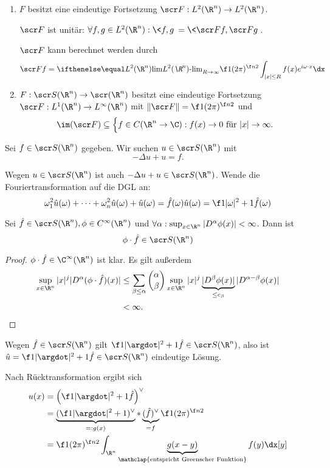 \begin{nt}[Fortsetzungen] \label{4.31}
	\begin{enumerate}[1)]
		\item
			$F$ besitzt eine eindeutige Fortsetzung $\scr F: L^2(\R^n) \to L^2(\R^n)$.

			$\scr F$ ist unitär: $\forall f, g \in L^2(\R^n) : \<f,g\> = \<\scr F f, \scr F g\>$.

			$\scr F$ kann berechnet werden durch
			\[
				\scr F f = \lim[L^2(\R^n)]_{R\to \infty} \f 1{(2\pi)^{\f n2}} \int_{|x|\le R} f(x) e^{i \omega\cdot x} \dx
			\]
		\item
			$F : \scr S(\R^n) \to \scr(\R^n)$ besitzt eine eindeutige Fortsetzung $\scr F: L^1(\R^n) \to L^\infty(\R^n)$ mit $\| \scr F \| = \f 1{(2\pi)^{\f n2}}$ und
			\[
				\im (\scr F) \subset \Big\{ f \in C(\R^n \to \C) : f(x) \to 0 \text{ für $|x| \to \infty$}.
			\]
	\end{enumerate}
\end{nt}

\begin{ex} \label{4.30}
	Sei $f \in \scr S(\R^n)$ gegeben.
	Wir suchen $u \in \scr S(\R^n)$ mit
	\[
		- \Delta u + u = f.
	\]

	Wegen $u \in \scr S(\R^n)$ ist auch $-\Delta u + u \in \scr S(\R^n)$.
	Wende die Fouriertransformation auf die DGL an:
	\[
		\omega_1^2 \hat u(\omega) + \dotsb + \omega_n^2 \hat u(\omega) + \hat u(\omega) = \hat f(\omega)
		\hat u (\omega) = \f 1{|\omega|^2 + 1} \hat f(\omega)
	\]

	\begin{st*}
		Sei $\hat f \in \scr S(\R^n), \phi \in C^\infty(\R^n)$ und $\forall \alpha : \sup_{x\in \R^n} |D^\alpha \phi(x)| < \infty$.
		Dann ist
		\[
			\phi \cdot \hat f \in \scr S(\R^n)
		\]
		\begin{proof}
			$\phi \cdot \hat f \in \C^\infty(\R^n)$ ist klar.
			Es gilt außerdem
			\begin{align*}
				\sup_{x \in \R^n} |x|^j |D^\alpha (\phi \cdot \hat f)(x) |
				&\le \sum_{\beta \le \alpha} \binom{\alpha}{\beta} \sup_{x \in \R^n} |x|^j \underbrace{|D^\beta \phi(x)|}_{\le c_\beta} | D^{\alpha-\beta} \phi(x)| \\
				&< \infty.
			\end{align*}
		\end{proof}
	\end{st*}

	Wegen $\hat f \in \scr S(\R^n)$ gilt $\f 1{|\argdot|^2+1} \hat f \in \scr S(\R^n)$, also ist $\hat u = \f 1{|\argdot|^2+1} \hat f \in \scr S(\R^n)$ eindeutige Lösung.

	Nach Rücktransformation ergibt sich
	\begin{align*}
		u(x)
		&= \Big( \f 1{|\argdot|^2+1} \hat f \Big)^\vee \\
		&= \underbrace{(\f 1{|\argdot|^2+1})^\vee}_{=:g(x)} \ast \underbrace{(\hat f)^\vee}_{=f} \f 1{(2\pi)^{\f n2}} \\
		&= \f 1{(2\pi)^{\f n2}} \int_{\R^n} \underbrace{g(x-y)}_{\mathclap{\text{entspricht Greenscher Funktion}}} f(y) \dx[y]
	\end{align*}
\end{ex}

